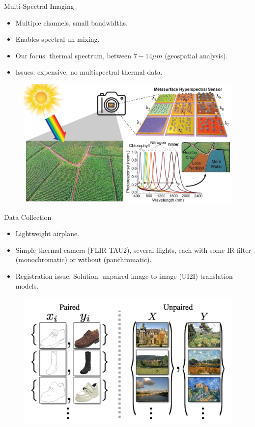 
\begin{frame}{Multi-Spectral Imaging}
  \begin{itemize}
    \item Multiple channels, small bandwidths.
    \item Enables spectral un-mixing.
    \item Our focus: thermal spectrum, between $7-14 \mu m$ (geospatial analysis). 
    \item Issues: expensive, no multispectral thermal data.
  \end{itemize}

  \begin{figure}
    \centering
    \includegraphics[width=0.5\linewidth]{../figs/introduction/multispectral.png}
  \end{figure}  
\end{frame}

\begin{frame}{Data Collection}
  \begin{itemize}
        \item Lightweight airplane.
        \item Simple thermal camera (FLIR TAU2), several flights, each with some IR filter (monochromatic) or without (panchromatic).
        \item Registration issue. Solution: unpaired image-to-image (UI2I) translation models.
    \end{itemize}
    \begin{figure}
        \centering
        \includegraphics[width=0.5\linewidth]{../figs/related_work/paird_vs_unpaired_I2I.png}
      \end{figure}
  \end{frame}


